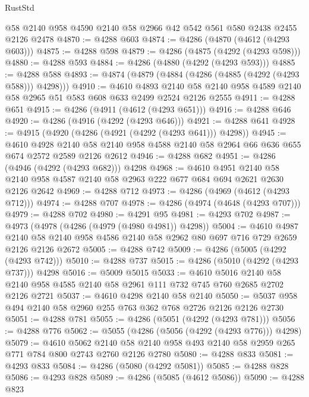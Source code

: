 \begin{lexlean}{RustStd}
\begin{coremodule}
    @58
    @2140
    @958
    @4590
    @2140
    @58
    @2966
    @42
    @542
    @561
    @580
    @2438
    @2455
    @2126
    @2478
@4870 := @4288 @603
@4874 := @4286 (@4870 (@4612 (@4293 @603)))
@4875 := @4288 @598
@4879 := @4286 (@4875 (@4292 (@4293 @598)))
@4880 := @4288 @593
@4884 := @4286 (@4880 (@4292 (@4293 @593)))
@4885 := @4288 @588
@4893 := @4874 (@4879 (@4884 (@4286 (@4885 (@4292 (@4293 @588))) @4298)))
@4910 := @4610
    @4893
    @2140
    @58
    @2140
    @958
    @4589
    @2140
    @58
    @2965
    @51
    @583
    @608
    @633
    @2499
    @2524
    @2126
    @2555
@4911 := @4288 @651
@4915 := @4286 (@4911 (@4612 (@4293 @651)))
@4916 := @4288 @646
@4920 := @4286 (@4916 (@4292 (@4293 @646)))
@4921 := @4288 @641
@4928 := @4915 (@4920 (@4286 (@4921 (@4292 (@4293 @641))) @4298))
@4945 := @4610
    @4928
    @2140
    @58
    @2140
    @958
    @4588
    @2140
    @58
    @2964
    @66
    @636
    @655
    @674
    @2572
    @2589
    @2126
    @2612
@4946 := @4288 @682
@4951 := @4286 (@4946 (@4292 (@4293 @682))) @4298
@4968 := @4610
    @4951
    @2140
    @58
    @2140
    @958
    @4587
    @2140
    @58
    @2963
    @222
    @677
    @684
    @694
    @2621
    @2630
    @2126
    @2642
@4969 := @4288 @712
@4973 := @4286 (@4969 (@4612 (@4293 @712)))
@4974 := @4288 @707
@4978 := @4286 (@4974 (@4648 (@4293 @707)))
@4979 := @4288 @702
@4980 := @4291 @95
@4981 := @4293 @702
@4987 := @4973 (@4978 (@4286 (@4979 (@4980 @4981)) @4298))
@5004 := @4610
    @4987
    @2140
    @58
    @2140
    @958
    @4586
    @2140
    @58
    @2962
    @80
    @697
    @716
    @729
    @2659
    @2126
    @2126
    @2672
@5005 := @4288 @742
@5009 := @4286 (@5005 (@4292 (@4293 @742)))
@5010 := @4288 @737
@5015 := @4286 (@5010 (@4292 (@4293 @737))) @4298
@5016 := @5009 @5015
@5033 := @4610
    @5016
    @2140
    @58
    @2140
    @958
    @4585
    @2140
    @58
    @2961
    @111
    @732
    @745
    @760
    @2685
    @2702
    @2126
    @2721
@5037 := @4610 @4298 @2140 @58 @2140
@5050 := @5037 @958 @494 @2140 @58 @2960 @255 @763 @362 @768 @2726 @2126 @2126 @2730
@5051 := @4288 @781
@5055 := @4286 (@5051 (@4292 (@4293 @781)))
@5056 := @4288 @776
@5062 := @5055 (@4286 (@5056 (@4292 (@4293 @776))) @4298)
@5079 := @4610
    @5062
    @2140
    @58
    @2140
    @958
    @493
    @2140
    @58
    @2959
    @265
    @771
    @784
    @800
    @2743
    @2760
    @2126
    @2780
@5080 := @4288 @833
@5081 := @4293 @833
@5084 := @4286 (@5080 (@4292 @5081))
@5085 := @4288 @828
@5086 := @4293 @828
@5089 := @4286 (@5085 (@4612 @5086))
@5090 := @4288 @823

\end{coremodule}
\end{lexlean}
